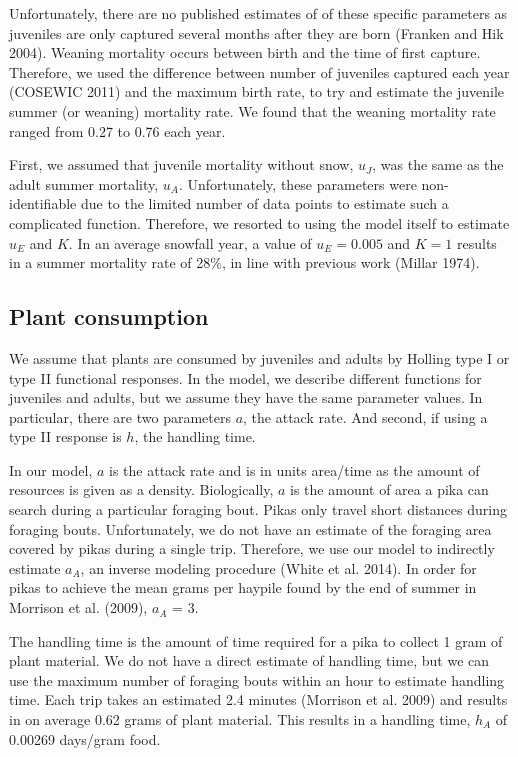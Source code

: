\documentclass[12pt,]{article}
\begin{document}
Unfortunately, there are no published estimates of of these specific
parameters as juveniles are only captured several months after they are
born (Franken and Hik 2004). Weaning mortality occurs between birth and
the time of first capture. Therefore, we used the difference between
number of juveniles captured each year (COSEWIC 2011) and the maximum
birth rate, to try and estimate the juvenile summer (or weaning)
mortality rate. We found that the weaning mortality rate ranged from
0.27 to 0.76 each year.

First, we assumed that juvenile mortality without snow, \(u_J\), was the
same as the adult summer mortality, \(u_A\). Unfortunately, these
parameters were non-identifiable due to the limited number of data
points to estimate such a complicated function. Therefore, we resorted
to using the model itself to estimate \(u_E\) and \(K\). In an average
snowfall year, a value of \(u_E = 0.005\) and \(K = 1\) results in a
summer mortality rate of 28\%, in line with previous work (Millar 1974).

\subsection{Plant consumption}

We assume that plants are consumed by juveniles and adults by Holling
type I or type II functional responses. In the model, we describe
different functions for juveniles and adults, but we assume they have
the same parameter values. In particular, there are two parameters
\(a\), the attack rate. And second, if using a type II response is
\(h\), the handling time.

In our model, \(a\) is the attack rate and is in units area/time as the
amount of resources is given as a density. Biologically, \(a\) is the
amount of area a pika can search during a particular foraging bout.
Pikas only travel short distances during foraging bouts. Unfortunately,
we do not have an estimate of the foraging area covered by pikas during
a single trip. Therefore, we use our model to indirectly estimate
\(a_A\), an inverse modeling procedure (White et al. 2014). In order for
pikas to achieve the mean grams per haypile found by the end of summer
in Morrison et al. (2009), \(a_A\) = 3.

The handling time is the amount of time required for a pika to collect 1
gram of plant material. We do not have a direct estimate of handling
time, but we can use the maximum number of foraging bouts within an hour
to estimate handling time. Each trip takes an estimated 2.4 minutes
(Morrison et al. 2009) and results in on average 0.62 grams of plant
material. This results in a handling time, \(h_A\) of 0.00269 days/gram
food.
\end{document}
